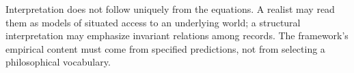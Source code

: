 Interpretation does not follow uniquely from the equations. A realist may read them as models of situated access to an underlying world; a structural interpretation may emphasize invariant relations among records. The framework's empirical content must come from specified predictions, not from selecting a philosophical vocabulary.

